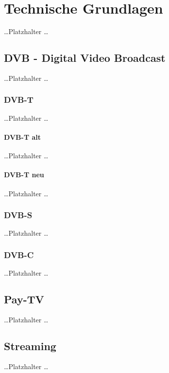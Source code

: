 \newpage
\section{Technische Grundlagen}
  \dots Platzhalter \dots

\subsection{DVB - Digital Video Broadcast}
  \dots Platzhalter \dots

\subsubsection{DVB-T}
  \dots Platzhalter \dots

\paragraph{DVB-T alt}
  \dots Platzhalter \dots

\paragraph{DVB-T neu}
  \dots Platzhalter \dots

\subsubsection{DVB-S}
  \dots Platzhalter \dots

\subsubsection{DVB-C}
  \dots Platzhalter \dots

\subsection{Pay-TV}
  \dots Platzhalter \dots

\subsection{Streaming}
  \dots Platzhalter \dots

